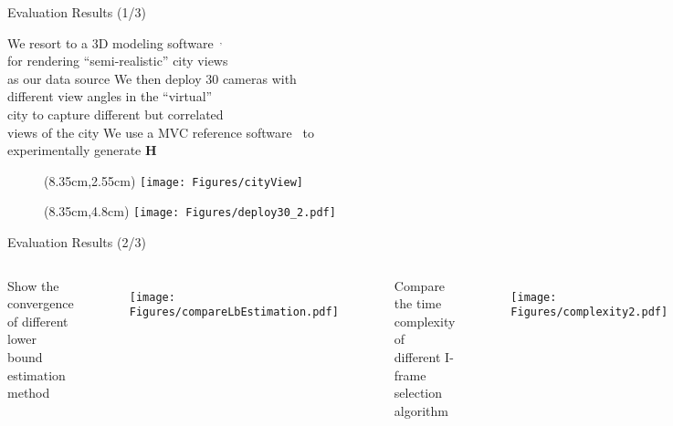 \begin{frame}{Evaluation Results (1/3)}
\begin{itemize}
	\myItem We resort to a 3D modeling software~$^,$~ \\
			for rendering ``semi-realistic'' city views \\
			as our data source
	\myItem We then deploy $30$ cameras with \\
			different view angles in the ``virtual'' \\
			city to capture different but correlated \\
			views of the city
	\myItem We use a MVC reference software~ to \\
			experimentally generate $\mathbf{H}$
\end{itemize}
% 
\begin{figure}
\centering
\begin{textblock*}{1cm}(8.35cm,2.55cm) %
\texttt{[image: Figures/cityView]}
\end{textblock*}
\end{figure}
%
\begin{figure}
\centering
\begin{textblock*}{1cm}(8.35cm,4.8cm) %
\texttt{[image: Figures/deploy30\_2.pdf]}
\end{textblock*}
\end{figure}
%
\end{frame}
\begin{frame}{Evaluation Results (2/3)}
\begin{columns}
\begin{itemize}
	\myItem Show the convergence of different lower bound estimation method
\end{itemize}
\begin{figure}
\centering
\texttt{[image: Figures/compareLbEstimation.pdf]}
\end{figure}
%
\begin{itemize}
	\myItem Compare the time complexity of different I-frame selection algorithm
\end{itemize}
\begin{figure}
\centering
\texttt{[image: Figures/complexity2.pdf]}
\end{figure}
\end{columns}
%
\end{frame}
